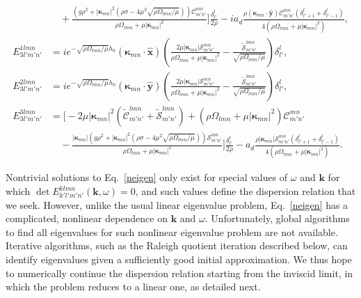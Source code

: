 \documentclass[aps,pre,amsmath,amssymb,floatfix,onecolumn,notitlepage,10pt]{revtex4-1}
\begin{document}
\begin{align}
&\quad + \frac{\left(g \rho ^2+\left\lvert \bm{\kappa}_{m n} \right\rvert^2 \left(\rho  \sigma -4 \mu ^2 \sqrt{{\rho  \Omega _{l m n}}/{\mu }}\right)\right)\mathcal{C}_{m' n'}^{m n} }{\rho  \Omega _{l m n}+\mu  \left\lvert \bm{\kappa}_{m n} \right\rvert^2} \Bigg] \frac{\delta^l_{l'}}{2\rho} - i a_d \frac{\rho \left( \bm{\kappa}_{mn}\cdot\hat{\mathbf{y}} \right) \mathcal{C}_{m' n'}^{m n} \left(\delta^l_{l'+1}+\delta^l_{l'-1}\right)}{4\left(\rho  \Omega _{l m n}+\mu  \left\lvert \bm{\kappa}_{m n} \right\rvert^2\right)}, \\
E_{3l'm'n'}^{1lmn} &=i e^ {-\sqrt{{\rho  \Omega _{l m n}}/{\mu }}h_0} \left( \bm{\kappa}_{mn}\cdot\hat{\mathbf{x}} \right) \left(\frac{2 \mu  \left\lvert \bm{\kappa}_{m n} \right\rvert \mathcal{S}_{m' n'}^{m n}}{\rho  \Omega _{l m n}+\mu  \left\lvert \bm{\kappa}_{m n} \right\rvert^2}-\frac{\tilde{\mathcal{S}}_{m' n'}^{l m n}}{\sqrt{{\rho  \Omega _{l m n}}/{\mu }}}\right) \delta^l_{l'},  \\
E_{3l'm'n'}^{2lmn} &=i e^ {-\sqrt{{\rho  \Omega _{l m n}}/{\mu }}h_0} \left( \bm{\kappa}_{mn}\cdot\hat{\mathbf{y}} \right) \left(\frac{2 \mu  \left\lvert \bm{\kappa}_{m n} \right\rvert \mathcal{S}_{m' n'}^{m n}}{\rho  \Omega _{l m n}+\mu  \left\lvert \bm{\kappa}_{m n} \right\rvert^2}-\frac{\tilde{\mathcal{S}}_{m' n'}^{l m n}}{\sqrt{{\rho  \Omega _{l m n}}/{\mu }}}\right) \delta^l_{l'}, \\
E_{3l'm'n'}^{3lmn} &= \Bigg[ -2 \mu  \left\lvert \bm{\kappa}_{m n} \right\rvert^2 \left( \tilde{\mathcal{C}}_{m' n'}^{l m n}  + \tilde{\mathcal{S}}_{m' n'}^{l m n} \right) + \left(\rho  \Omega _{l m n}+\mu  \left\lvert \bm{\kappa}_{m n} \right\rvert^2\right) \mathcal{C}_{m' n'}^{m n}  \nonumber \\
&\quad-\frac{\left\lvert \bm{\kappa}_{m n} \right\rvert \left(g \rho ^2+\left\lvert \bm{\kappa}_{m n} \right\rvert^2 \left(\rho  \sigma -4 \mu ^2 \sqrt{{\rho  \Omega _{l m n}}/{\mu }}\right)\right) \mathcal{S}_{m' n'}^{m n}  }{\rho  \Omega _{l m n}+\mu  \left\lvert \bm{\kappa}_{m n} \right\rvert^2}\Bigg]  \frac{\delta^l_{l'}}{2\rho} -a_d\frac{\rho \left\lvert \bm{\kappa}_{m n} \right\rvert \mathcal{S}_{m' n'}^{m n} \left(\delta^l_{l'+1}+\delta^l_{l'-1}\right)}{4\left(\rho  \Omega _{l m n}+\mu  \left\lvert \bm{\kappa}_{m n} \right\rvert^2\right)}.
\end{align}

Nontrivial solutions to Eq.~\eqref{neigen} only exist for special values of $\omega$ and $\mathbf{k}$ for which $\det E_{k'l'm'n'}^{klmn}(\mathbf{k},\omega)=0$, and such values define the dispersion relation that we seek. However, unlike the usual linear eigenvalue problem, Eq.~\eqref{neigen} has a complicated, nonlinear dependence on $\mathbf{k}$ and $\omega$. Unfortunately, global algorithms to find all eigenvalues for such nonlinear eigenvalue problem are not available. Iterative algorithms, such as the Raleigh quotient iteration described below, can identify eigenvalues given a sufficiently good initial approximation. We thus hope to numerically continue the dispersion relation starting from the inviscid limit, in which the problem reduces to a linear one, as detailed next.
\end{document}
